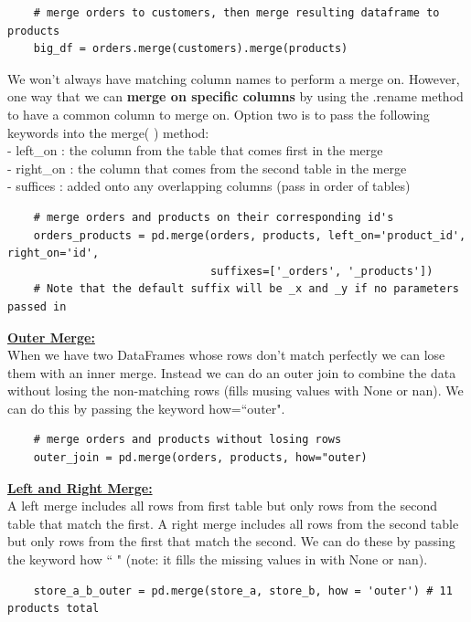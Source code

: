 \documentclass[11pt, a4paper]{article}
\begin{document}
\begin{spacing}{1.1}
\begin{lstlisting}
	# merge orders to customers, then merge resulting dataframe to products
	big_df = orders.merge(customers).merge(products) \end{lstlisting}\vspace*{1mm}
	We won't always have matching column names to perform a merge on. However, one way that we can \textbf{merge on specific columns} by using the .rename method to have a common column to merge on. Option two is to pass the following keywords into the merge( ) method: \\
	\hspace*{3mm} - left\_on : the column from the table that comes first in the merge \\
	\hspace*{3mm} - right\_on : the column that comes from the second table in the merge \\
	\hspace*{3mm} - suffices : added onto any overlapping columns (pass in order of tables)
	\begin{lstlisting}
	# merge orders and products on their corresponding id's
	orders_products = pd.merge(orders, products, left_on='product_id', right_on='id', 
	                           suffixes=['_orders', '_products']) 
	# Note that the default suffix will be _x and _y if no parameters passed in \end{lstlisting}\vspace*{1mm}
	\underline{\textbf{Outer Merge:}} \\
	When we have two DataFrames whose rows don't match perfectly we can lose them with an inner merge. Instead we can do an outer join to combine the data without losing the non-matching rows (fills musing values with None or nan). We can do this by passing the keyword how=``outer".
	\begin{lstlisting}
	# merge orders and products without losing rows
	outer_join = pd.merge(orders, products, how="outer) \end{lstlisting}\vspace*{1mm}
	\underline{\textbf{Left and Right Merge:}} \\
	A left merge includes all rows from first table but only rows from the second table that match the first. A right merge includes all rows from the second table but only rows from the first that match the second. We can do these by passing the keyword how `` " (note: it fills the missing values in with None or nan). 
	\begin{lstlisting}
	store_a_b_outer = pd.merge(store_a, store_b, how = 'outer') # 11 products total

\end{lstlisting}
\end{spacing}
\end{document}
